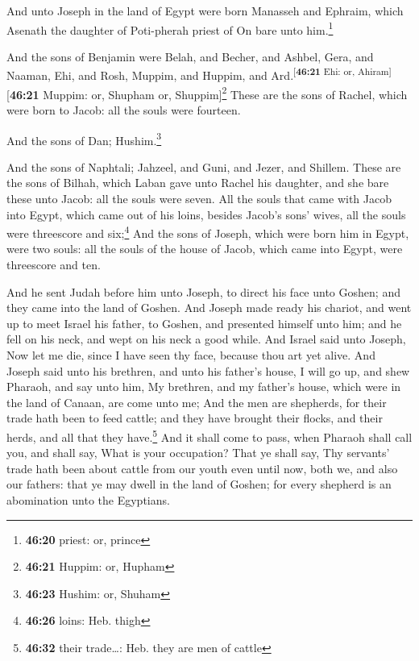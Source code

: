  And unto Joseph in the land of Egypt were born Manasseh
and Ephraim, which Asenath the daughter of Poti-pherah priest of On bare
unto him.\footnote{\textbf{46:20} priest: or, prince}

 And the sons of Benjamin were Belah, and Becher, and
Ashbel, Gera, and Naaman, Ehi, and Rosh, Muppim, and Huppim, and
Ard.\textsuperscript{{[}\textbf{46:21} Ehi: or,
Ahiram{]}}{[}\textbf{46:21} Muppim: or, Shupham or,
Shuppim{]}\footnote{\textbf{46:21} Huppim: or, Hupham} 
These are the sons of Rachel, which were born to Jacob: all the souls
were fourteen.

 And the sons of Dan; Hushim.\footnote{\textbf{46:23}
  Hushim: or, Shuham}

 And the sons of Naphtali; Jahzeel, and Guni, and Jezer,
and Shillem.  These are the sons of Bilhah, which Laban
gave unto Rachel his daughter, and she bare these unto Jacob: all the
souls were seven.  All the souls that came with Jacob
into Egypt, which came out of his loins, besides Jacob's sons' wives,
all the souls were threescore and six;\footnote{\textbf{46:26} loins:
  Heb. thigh}  And the sons of Joseph, which were born
him in Egypt, were two souls: all the souls of the house of Jacob, which
came into Egypt, were threescore and ten.

 And he sent Judah before him unto Joseph, to direct his
face unto Goshen; and they came into the land of Goshen. 
And Joseph made ready his chariot, and went up to meet Israel his
father, to Goshen, and presented himself unto him; and he fell on his
neck, and wept on his neck a good while.  And Israel said
unto Joseph, Now let me die, since I have seen thy face, because thou
art yet alive.  And Joseph said unto his brethren, and
unto his father's house, I will go up, and shew Pharaoh, and say unto
him, My brethren, and my father's house, which were in the land of
Canaan, are come unto me;  And the men are shepherds, for
their trade hath been to feed cattle; and they have brought their
flocks, and their herds, and all that they have.\footnote{\textbf{46:32}
  their trade\ldots: Heb. they are men of cattle}  And it
shall come to pass, when Pharaoh shall call you, and shall say, What is
your occupation?  That ye shall say, Thy servants' trade
hath been about cattle from our youth even until now, both we, and also
our fathers: that ye may dwell in the land of Goshen; for every shepherd
is an abomination unto the Egyptians.


